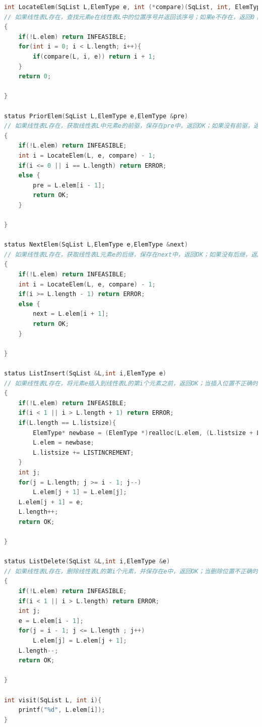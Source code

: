 \documentclass[supercite]{Experimental_Report}
\theoremstyle{definition}
\begin{document}
\begin{lstlisting}[language=c]
int LocateElem(SqList L,ElemType e, int (*compare)(SqList, int, ElemType))
// 如果线性表L存在，查找元素e在线性表L中的位置序号并返回该序号；如果e不存在，返回0；当线性表L不存在时，返回INFEASIBLE（即-1）。
{
    if(!L.elem) return INFEASIBLE;
    for(int i = 0; i < L.length; i++){
        if(compare(L, i, e)) return i + 1;
    }
    return 0;

}

status PriorElem(SqList L,ElemType e,ElemType &pre)
// 如果线性表L存在，获取线性表L中元素e的前驱，保存在pre中，返回OK；如果没有前驱，返回ERROR；如果线性表L不存在，返回INFEASIBLE。
{
    if(!L.elem) return INFEASIBLE;
    int i = LocateElem(L, e, compare) - 1;
    if(i <= 0 || i == L.length) return ERROR;
    else {
        pre = L.elem[i - 1];
        return OK;
    }

}

status NextElem(SqList L,ElemType e,ElemType &next)
// 如果线性表L存在，获取线性表L元素e的后继，保存在next中，返回OK；如果没有后继，返回ERROR；如果线性表L不存在，返回INFEASIBLE。
{
    if(!L.elem) return INFEASIBLE;
    int i = LocateElem(L, e, compare) - 1;
    if(i >= L.length - 1) return ERROR;
    else {
        next = L.elem[i + 1];
        return OK;
    }

}

status ListInsert(SqList &L,int i,ElemType e)
// 如果线性表L存在，将元素e插入到线性表L的第i个元素之前，返回OK；当插入位置不正确时，返回ERROR；如果线性表L不存在，返回INFEASIBLE。
{
    if(!L.elem) return INFEASIBLE;
    if(i < 1 || i > L.length + 1) return ERROR;
    if(L.length == L.listsize){
        ElemType* newbase = (ElemType *)realloc(L.elem, (L.listsize + LISTINCREMENT) * sizeof(ElemType));
        L.elem = newbase;
        L.listsize += LISTINCREMENT;
    }
    int j;
    for(j = L.length; j >= i - 1; j--)
        L.elem[j + 1] = L.elem[j];
    L.elem[j + 1] = e;
    L.length++;
    return OK;

}

status ListDelete(SqList &L,int i,ElemType &e)
// 如果线性表L存在，删除线性表L的第i个元素，并保存在e中，返回OK；当删除位置不正确时，返回ERROR；如果线性表L不存在，返回INFEASIBLE。
{
    if(!L.elem) return INFEASIBLE;
    if(i < 1 || i > L.length) return ERROR;
    int j;
    e = L.elem[i - 1];
    for(j = i - 1; j <= L.length ; j++)
        L.elem[j] = L.elem[j + 1];
    L.length--;
    return OK;

}

int visit(SqList L, int i){
	printf("%d", L.elem[i]);
}


\end{lstlisting}
\end{document}
